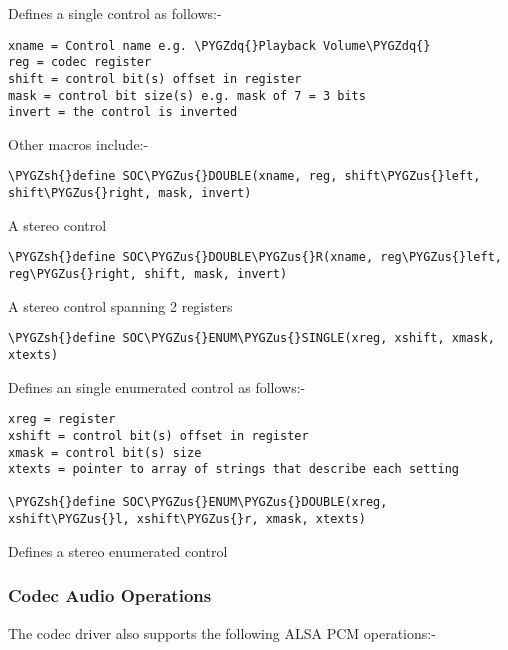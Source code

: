 \documentclass[a4paper,8pt,english]{sphinxmanual}
\def\PYGZus{\char`\_}
\def\PYGZsh{\char`\#}
\def\PYGZdq{\char`\"}
\begin{document}
Defines a single control as follows:-

\begin{Verbatim}[commandchars=\\\{\}]
xname = Control name e.g. \PYGZdq{}Playback Volume\PYGZdq{}
reg = codec register
shift = control bit(s) offset in register
mask = control bit size(s) e.g. mask of 7 = 3 bits
invert = the control is inverted
\end{Verbatim}

Other macros include:-

\begin{Verbatim}[commandchars=\\\{\}]
\PYGZsh{}define SOC\PYGZus{}DOUBLE(xname, reg, shift\PYGZus{}left, shift\PYGZus{}right, mask, invert)
\end{Verbatim}

A stereo control

\begin{Verbatim}[commandchars=\\\{\}]
\PYGZsh{}define SOC\PYGZus{}DOUBLE\PYGZus{}R(xname, reg\PYGZus{}left, reg\PYGZus{}right, shift, mask, invert)
\end{Verbatim}

A stereo control spanning 2 registers

\begin{Verbatim}[commandchars=\\\{\}]
\PYGZsh{}define SOC\PYGZus{}ENUM\PYGZus{}SINGLE(xreg, xshift, xmask, xtexts)
\end{Verbatim}

Defines an single enumerated control as follows:-

\begin{Verbatim}[commandchars=\\\{\}]
xreg = register
xshift = control bit(s) offset in register
xmask = control bit(s) size
xtexts = pointer to array of strings that describe each setting

\PYGZsh{}define SOC\PYGZus{}ENUM\PYGZus{}DOUBLE(xreg, xshift\PYGZus{}l, xshift\PYGZus{}r, xmask, xtexts)
\end{Verbatim}

Defines a stereo enumerated control


\subsubsection{Codec Audio Operations}
\label{sound/soc/codec:codec-audio-operations}
The codec driver also supports the following ALSA PCM operations:-
\end{document}
